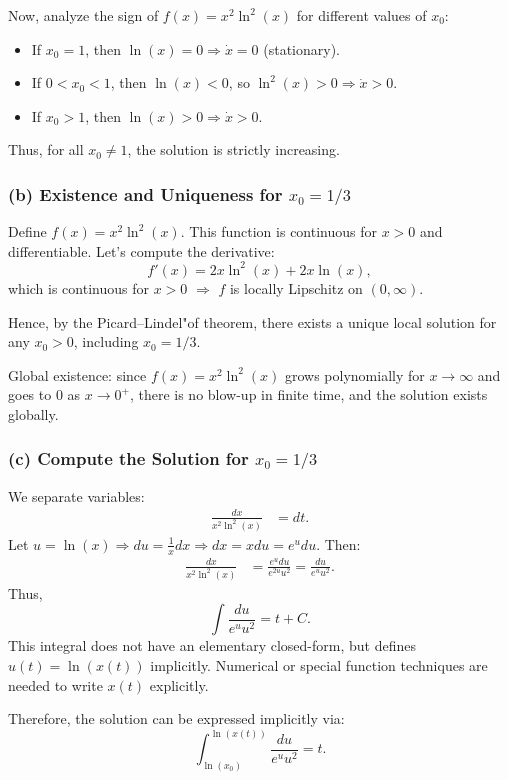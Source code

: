 Now, analyze the sign of $f(x) = x^2 \ln^2(x)$ for different values of $x_0$:
\begin{itemize}
  \item If $x_0 = 1$, then $\ln(x) = 0 \Rightarrow \dot{x} = 0$ (stationary).
  \item If $0 < x_0 < 1$, then $\ln(x) < 0$, so $\ln^2(x) > 0 \Rightarrow \dot{x} > 0$.
  \item If $x_0 > 1$, then $\ln(x) > 0 \Rightarrow \dot{x} > 0$.
\end{itemize}
Thus, for all $x_0 \neq 1$, the solution is strictly increasing.

\subsubsection*{(b) Existence and Uniqueness for $x_0 = 1/3$}
Define $f(x) = x^2 \ln^2(x)$. This function is continuous for $x > 0$ and differentiable. Let's compute the derivative:
\[ f'(x) = 2x \ln^2(x) + 2x \ln(x), \]
which is continuous for $x > 0$ $\Rightarrow$ $f$ is locally Lipschitz on $(0, \infty)$.

Hence, by the Picard–Lindel"of theorem, there exists a unique local solution for any $x_0 > 0$, including $x_0 = 1/3$.

Global existence: since $f(x) = x^2 \ln^2(x)$ grows polynomially for $x \to \infty$ and goes to $0$ as $x \to 0^+$, there is no blow-up in finite time, and the solution exists globally.

\subsubsection*{(c) Compute the Solution for $x_0 = 1/3$}
We separate variables:
\begin{align*}
\frac{dx}{x^2 \ln^2(x)} &= dt.
\end{align*}
Let $u = \ln(x) \Rightarrow du = \frac{1}{x} dx \Rightarrow dx = x du = e^u du$.
Then:
\begin{align*}
\frac{dx}{x^2 \ln^2(x)} &= \frac{e^u du}{e^{2u} u^2} = \frac{du}{e^u u^2}.
\end{align*}
Thus,
\[ \int \frac{du}{e^u u^2} = t + C. \]
This integral does not have an elementary closed-form, but defines $u(t) = \ln(x(t))$ implicitly. Numerical or special function techniques are needed to write $x(t)$ explicitly.

Therefore, the solution can be expressed implicitly via:
\[ \int_{\ln(x_0)}^{\ln(x(t))} \frac{du}{e^u u^2} = t. \]
